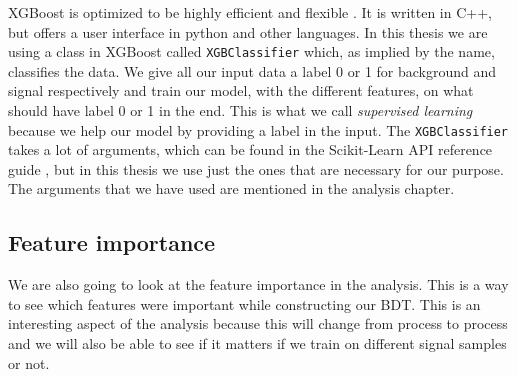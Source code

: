 XGBoost is optimized to be highly efficient and flexible \cite{xgboostAbout}. It is written in C++, but offers a user interface in python and other languages. In this thesis we are using a class in XGBoost called \texttt{XGBClassifier} which, as implied by the name, classifies the data. We give all our input data a label 0 or 1 for background and signal respectively and train our model, with the different features, on what should have label 0 or 1 in the end. This is what we call \textit{supervised learning} because we help our model by providing a label in the input. The \texttt{XGBClassifier} takes a lot of arguments, which can be found in the Scikit-Learn API reference guide \cite{xgboostargument}, but in this thesis we use just the ones that are necessary for our purpose. The arguments that we have used are mentioned in the analysis chapter.

\subsection{Feature importance}
We are also going to look at the feature importance in the analysis. This is a way to see which features were important while constructing our BDT. This is an interesting aspect of the analysis because this will change from process to process and we will also be able to see if it matters if we train on different signal samples or not.
